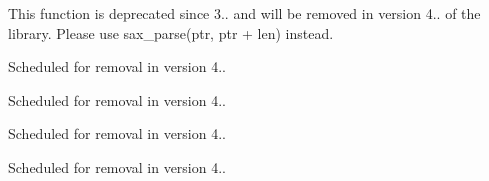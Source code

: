 \begin{DoxyRefList}
\label{deprecated__deprecated000007}%
%
This function is deprecated since 3.. and will be removed in version 4.. of the library. Please use sax\+\_\+parse(ptr, ptr + len) instead.  
\item[Member \mbox{\hyperlink{group__input_ga78c3d45fdf9aaef0b8d670bf2a9519e2}{GLFWcharmodsfun}} )(GLFWwindow $\ast$, unsigned int, int)]\label{deprecated__deprecated000009}%
%
Scheduled for removal in version 4..

\label{deprecated__deprecated000011}%
%
Scheduled for removal in version 4.. 
\item[Member \mbox{\hyperlink{group__input_gae6eee0bda7429bfe8028615847cf6795}{glfw\+Set\+Char\+Mods\+Callback}} (GLFWwindow $\ast$window, GLFWcharmodsfun cbfun)]\label{deprecated__deprecated000010}%
%
Scheduled for removal in version 4..

\label{deprecated__deprecated000012}%
%
Scheduled for removal in version 4..
\end{DoxyRefList}